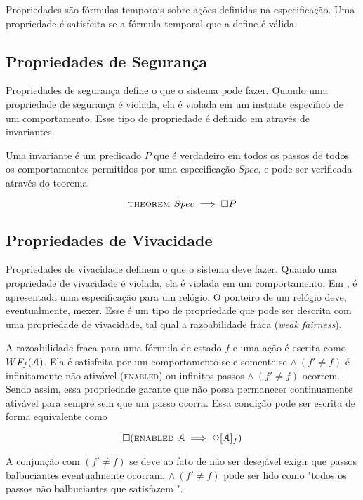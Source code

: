 Propriedades são fórmulas temporais sobre ações definidas na especificação. Uma propriedade é satisfeita se a fórmula temporal que a define é válida.

\subsection{Propriedades de Segurança}

Propriedades de segurança define o que o sistema pode fazer. Quando uma propriedade de segurança é violada, ela é violada em um instante específico de um comportamento. Esse tipo de propriedade é definido em \TLA através de invariantes.

Uma invariante é um predicado $P$ que é verdadeiro em todos os passos de todos os comportamentos permitidos por uma especificação $Spec$, e pode ser verificada através do teorema

\[\textsc{theorem } Spec \implies \square P\]

\subsection{Propriedades de Vivacidade}

Propriedades de vivacidade definem o que o sistema deve fazer. Quando uma propriedade de vivacidade é violada, ela é violada em um comportamento. Em \cite{specifying-systems}, é apresentada uma especificação para um relógio. O ponteiro de um relógio deve, eventualmente, mexer. Esse é um tipo de propriedade que pode ser descrita com uma propriedade de vivacidade, tal qual a razoabilidade fraca (\textit{weak fairness}).

A razoabilidade fraca para uma fórmula de estado $f$ e uma ação \FANCYA é escrita como $WF_f (\textbf{$\mathcal{A}$})$. Ela é satisfeita por um comportamento se e somente se \FANCYA $\land\ (f' \neq f)$ é infinitamente não ativável (\textsc{enabled}) ou infinitos passos \FANCYA $\land\ (f' \neq f)$ ocorrem. Sendo assim, essa propriedade garante que \FANCYA não possa permanecer continuamente ativável para sempre sem que um passo \FANCYA ocorra. Essa condição pode ser escrita de forma equivalente como

\[\square (\textsc{enabled } \textbf{$\mathcal{A}$} \implies \Diamond[\textbf{$\mathcal{A}$}]_f)\]

A conjunção com $(f' \neq f)$ se deve ao fato de não ser desejável exigir que passos balbuciantes eventualmente ocorram. \FANCYA $\land\ (f' \neq f)$ pode ser lido como "todos os passos não balbuciantes que satisfazem \FANCYA".

